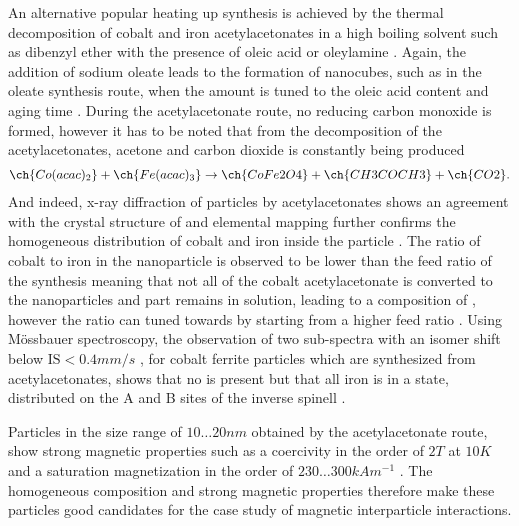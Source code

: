 \documentclass[\main/dresen_thesis.tex]{subfiles}
\begin{document}
  An alternative popular heating up synthesis is achieved by the thermal decomposition of cobalt and iron acetylacetonates in a high boiling solvent such as dibenzyl ether with the presence of oleic acid or oleylamine \cite{Sun_2002_SizeC, Wu_2014_Monol}.
  Again, the addition of sodium oleate leads to the formation of nanocubes, such as in the oleate synthesis route, when the amount is tuned to the oleic acid content and aging time \cite{Wu_2014_Monol}.
  During the acetylacetonate route, no reducing carbon monoxide is formed, however it has to be noted that from the decomposition of the acetylacetonates, acetone and carbon dioxide is constantly being produced \cite{Lu_2015_Synth}
  \begin{align}
    \ch{Co(acac)_2} + \ch{Fe(acac)_3} \rightarrow \ch{CoFe2O4} + \ch{CH3COCH3} + \ch{CO2}.
  \end{align}
  And indeed, x-ray diffraction of particles by acetylacetonates shows an agreement with the crystal structure of  \cite{Wu_2014_Monol, Sathya_2016_Cofeo} and elemental mapping further confirms the homogeneous distribution of cobalt and iron inside the particle \cite{Sathya_2016_Cofeo}.
  The ratio of cobalt to iron in the nanoparticle is observed to be lower than the feed ratio of the synthesis meaning that not all of the cobalt acetylacetonate is converted to the nanoparticles and part remains in solution, leading to a composition of , however the ratio can tuned towards  by starting from a higher feed ratio  \cite{Sathya_2016_Cofeo, Yu_2013_Cobal, Wu_2014_Monol}.
  Using M\"ossbauer spectroscopy, the observation of two sub-spectra with an isomer shift below $\mathrm{IS} < 0.4 \unit{mm/s}$ \cite{Pianciola_2014_Sizea}, for cobalt ferrite particles which are synthesized from acetylacetonates, shows that no  is present but that all iron is in a  state, distributed on the A and B sites of the inverse spinell \cite{Angotzi_2017_Spine, Figuera_2015_Moess}.

  Particles in the size range of $10 \ldots 20 \unit{nm}$ obtained by the acetylacetonate route, show strong magnetic properties such as a coercivity in the order of $2 \unit{T}$ at $10 \unit{K}$ \cite{Sun_2002_SizeC, Sathya_2016_Cofeo} and a saturation magnetization in the order of $230 \ldots 300 \unit{kA m^{-1}}$ \cite{Wu_2014_Monol, Sathya_2016_Cofeo}.
  The homogeneous composition and strong magnetic properties therefore make these particles good candidates for the case study of magnetic interparticle interactions.
  \\
\end{document}
